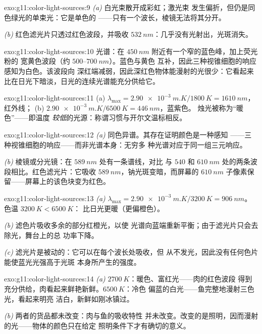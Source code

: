 \begin{solution}{exo:g11:color-light-sources:9}
\emph{(a)} 白光束散开成彩虹；激光束
发生偏折，但仍是同色绿光的单束光：它是单色的
——只有一个波长，棱镜无法将其分开。

\emph{(b)} 红色滤光片只透过红色波段，并吸收
$\qty{532}{nm}$：几乎没有光射出，光斑消失。
\end{solution}

\begin{solution}{exo:g11:color-light-sources:10}
光谱：在 $\qty{450}{nm}$ 附近有一个窄的蓝色峰，加上荧光粉的
宽黄色波段（约 $500$--$\qty{700}{nm}$）。蓝色与黄色
互补，因此三种视锥细胞的响应感知为白色。该波段向
深红端减弱，因此深红色物体能漫射的光很少：它看起来
比在日光下暗淡，日光的连续光谱能充分供给它。
\end{solution}

\begin{solution}{exo:g11:color-light-sources:11}
(a) $\lambda_{\max} = \qty{2.90e-3}{m.K}/\qty{1800}{K}
= \qty{1610}{nm}$，红外线；
(b) $\qty{2.90e-3}{m.K}/\qty{6500}{K} = \qty{446}{nm}$，蓝紫色。
烛光被称为“暖色”——即温度
\emph{较低}的光源：称谓习惯与开尔文温标相反。
\end{solution}

\begin{solution}{exo:g11:color-light-sources:12}
\emph{(a)} 同色异谱。其存在证明颜色是一种感知
——三种视锥细胞的响应——而非光谱本身：无穷多
种光谱对应于同一组三元响应。

\emph{(b)} 棱镜或分光镜：在 $\qty{589}{nm}$ 处有一条谱线，对比
与 $540$ 和 $\qty{610}{nm}$ 处的两条波段相比。红色滤光片：它吸收
$\qty{589}{nm}$，钠光斑变暗，而屏幕的
$\qty{610}{nm}$ 子像素保留——屏幕上的该色块变为红色。
\end{solution}

\begin{solution}{exo:g11:color-light-sources:13}
\emph{(a)} $\lambda_{\max} = \qty{2.90e-3}{m.K}/\qty{3200}{K} =
\qty{906}{nm}$。色温 $\qty{3200}{K} < \qty{6500}{K}$：
比日光更暖（更偏橙色）。

\emph{(b)} 滤色片吸收多余的部分红橙光，以使
光谱向蓝端重新平衡；由于滤光片只会去除光，舞台上的总
功率下降。

\emph{(c)} 滤光片是被动的：它可以在每个波长处吸收，但
从不发光，因此没有任何色片能使蓝光光强高于光斑
本身所产生的强度。
\end{solution}

\begin{solution}{exo:g11:color-light-sources:14}
\emph{(a)} $\qty{2700}{K}$：暖色、富红光——肉的红色波段
得到充分供给，肉看起来鲜艳新鲜。$\qty{6500}{K}$：冷色
偏蓝的白光——鱼完整地漫射三色光，看起来明亮
洁白，新鲜如刚冰镇过。

\emph{(b)} 两者的货品都未改变：肉与鱼的吸收特性
并未改变。改变的是照明，因而漫射
的光——物体的颜色只在给定
照明条件下才有确切的意义。
\end{solution}

